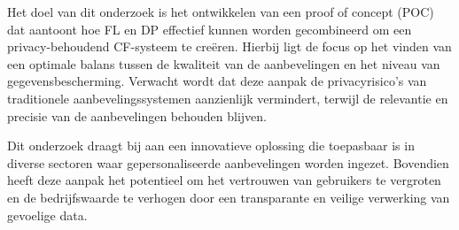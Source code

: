 Het doel van dit onderzoek is het ontwikkelen van een proof of concept (POC) dat aantoont hoe FL en DP effectief kunnen worden gecombineerd om een privacy-behoudend CF-systeem te creëren. Hierbij ligt de focus op het vinden van een optimale balans tussen de kwaliteit van de aanbevelingen en het niveau van gegevensbescherming. Verwacht wordt dat deze aanpak de privacyrisico's van traditionele aanbevelingssystemen aanzienlijk vermindert, terwijl de relevantie en precisie van de aanbevelingen behouden blijven.

Dit onderzoek draagt bij aan een innovatieve oplossing die toepasbaar is in diverse sectoren waar gepersonaliseerde aanbevelingen worden ingezet. Bovendien heeft deze aanpak het potentieel om het vertrouwen van gebruikers te vergroten en de bedrijfswaarde te verhogen door een transparante en veilige verwerking van gevoelige data.
